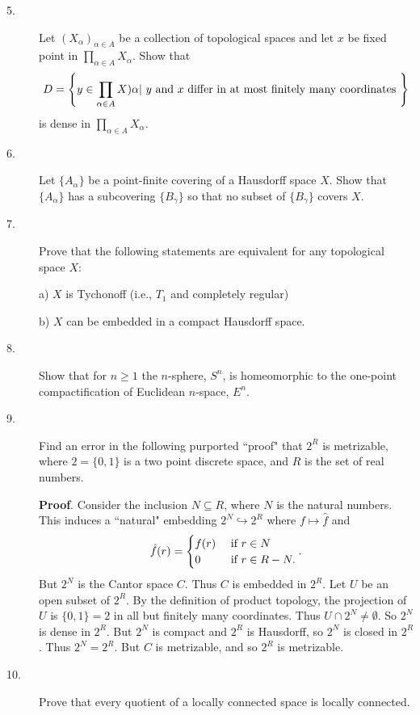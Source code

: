 \documentclass{article}
\begin{document}
\begin{description}
\item[5.]
Let $(X_\alpha) _{\alpha \in A}$ be a collection of topological spaces and
let $x$ be fixed point in $\prod_{\alpha \in A} X_\alpha$. Show that
$$D= \left\{ y \in \prod_{\alpha \in A} X) \alpha |\  y \hbox{\ and\ } x
\hbox{\ differ\ } \hbox{in\ } \hbox{at\ } \hbox{most\ } \hbox{finitely\ }
\hbox{many\ } \hbox{coordinates\ } \right\}$$
is dense in $\prod_{\alpha \in A} X_\alpha$.

\item[6.]
Let $\{A_\alpha\}$ be a point-finite covering of a Hausdorff space $X$. Show
that $\{A_\alpha\}$ has a subcovering $\{B_\gamma\}$ so that no subset of
$\{B_\gamma\}$ covers $X$.

\item[7.]
Prove that the following statements are equivalent for any topological space
$X$:

\item[\quad] a)
$X$ is Tychonoff (i.e., $T_1$ and completely regular)

\item[\quad] b)
$X$ can be embedded in a compact Hausdorff space.

\item[8.]
Show that for $n \geq 1$ the $n$-sphere, $S^n$, is homeomorphic to the
one-point compactification of Euclidean $n$-space, $E^n$.

\item[9.]
Find an error in the following purported ``proof" that $2^R$ is metrizable,
where $2=\{0,1\}$ is a two point discrete space, and $R$ is the set of
real numbers.

{\bf Proof}. Consider the inclusion $N \subseteq R$, where $N$ is the natural
numbers. This induces a ``natural" embedding $2^N \hookrightarrow 2^R$
where $f \mapsto \hat f$ and
$$\hat f (r) = \begin{cases}
                f(r) &\hbox{\ if\ } r \in N \\
                0 &\hbox{\ if\ } r \in R-N.
                \end{cases}.$$
But $2^N$ is the Cantor space $C$. Thus $C$ is embedded in $2^R$. Let $U$ be
an open subset of $2^R$. By the definition of product topology, the projection
of $U$ is $\{0,1\} = 2$ in all but finitely many coordinates. Thus
$U \cap 2^N \neq \emptyset$. So $2^N$ is dense in $2^R$. But $2^N$ is compact
and $2^R$ is Hausdorff, so $2^N$ is closed in $2^R$. Thus $2^N = 2^R$. But
$C$ is metrizable, and so $2^R$ is metrizable.

\item[10.]
Prove that every quotient of a locally connected space is locally connected.


\end{description}
\end{document}
